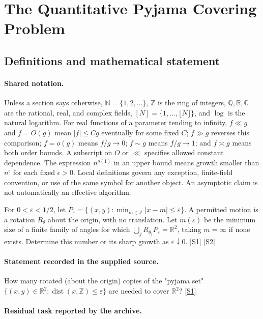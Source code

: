 \documentclass[11pt,a4paper]{article}
\newcommand{\N}{\mathbb{N}}
\newcommand{\Z}{\mathbb{Z}}
\newcommand{\Q}{\mathbb{Q}}
\newcommand{\R}{\mathbb{R}}
\newcommand{\C}{\mathbb{C}}
\newcommand{\sref}[2]{\hyperlink{source:#1:#2}{[S#2]}}
\begin{document}
\section{The Quantitative Pyjama Covering Problem}\label{statement}


\subsection{Definitions and mathematical statement}

\paragraph{Shared notation.}Unless a section says otherwise, $\N=\{1,2,\ldots\}$,
$\Z$ is the ring of integers, $\Q,\R,\C$ are the rational, real, and complex
fields, $[N]=\{1,\ldots,\lfloor N\rfloor\}$, and $\log$ is the natural
logarithm. For real functions of a parameter tending to infinity,
$f\ll g$ and $f=O(g)$ mean $|f|\leq Cg$ eventually for some fixed $C$;
$f\gg g$ reverses this comparison; $f=o(g)$ means $f/g\to0$;
$f\sim g$ means $f/g\to1$; and $f\asymp g$ means both order bounds.
A subscript on $O$ or $\ll$ specifies allowed constant dependence.
The expression $n^{o(1)}$ in an upper bound means growth smaller than
$n^\epsilon$ for each fixed $\epsilon>0$. Local definitions govern any
exception, finite-field convention, or use of the same symbol for another
object. An asymptotic claim is not automatically an effective algorithm.



For $0<\varepsilon<1/2$, let $P_\varepsilon=\{(x,y):\min_{m\in\Z}|x-m|\leq\varepsilon\}$. A permitted motion is a rotation $R_\theta$ about the origin, with no translation. Let $m(\varepsilon)$ be the minimum size of a finite family of angles for which $\bigcup_j R_{\theta_j}P_\varepsilon=\R^2$, taking $m=\infty$ if none exists. Determine this number or its sharp growth as $\varepsilon\downarrow0$. \sref{statement}{1} \sref{statement}{2}

\paragraph{Statement recorded in the supplied source.}
How many rotated (about the origin) copies of the "pyjama set" $\{(x, y) \in \mathbb{R}^2 : \operatorname{dist}(x, \mathbb{Z}) \leq \varepsilon\}$ are needed to cover $\mathbb{R}^2$? \sref{statement}{1}

\paragraph{Residual task reported by the archive.}
\end{document}
